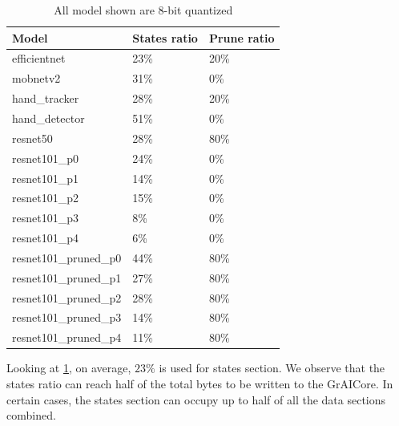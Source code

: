 \begin{table}[hbtp]
\centering
\begin{tabular}{@{}lll@{}}
\toprule
\textbf{Model}          & \textbf{States ratio} & \textbf{Prune ratio} \\ \midrule
efficientnet            & 23\%                  & 20\%                 \\
mobnetv2                & 31\%                  & 0\%                  \\
hand\_tracker           & 28\%                  & 20\%                 \\
hand\_detector          & 51\%                  & 0\%                  \\
resnet50                & 28\%                  & 80\%                 \\
resnet101\_p0           & 24\%                  & 0\%                  \\
resnet101\_p1           & 14\%                  & 0\%                  \\
resnet101\_p2           & 15\%                  & 0\%                  \\
resnet101\_p3           & 8\%                   & 0\%                  \\
resnet101\_p4           & 6\%                   & 0\%                  \\
resnet101\_pruned\_p0   & 44\%                  & 80\%                 \\
resnet101\_pruned\_p1   & 27\%                  & 80\%                 \\
resnet101\_pruned\_p2   & 28\%                  & 80\%                 \\
resnet101\_pruned\_p3   & 14\%                  & 80\%                 \\
resnet101\_pruned\_p4   & 11\%                  & 80\%                 \\ \bottomrule
\end{tabular}
\caption{All model shown are 8-bit quantized}
\label{tab:states_ratio}
\end{table}

Looking at \cref{tab:states_ratio}, on average, $23\%$ is used for states section.
We observe that the states ratio can reach half of the total bytes to be written to the GrAICore.
In certain cases, the states section can occupy up to half of all the data sections combined.

